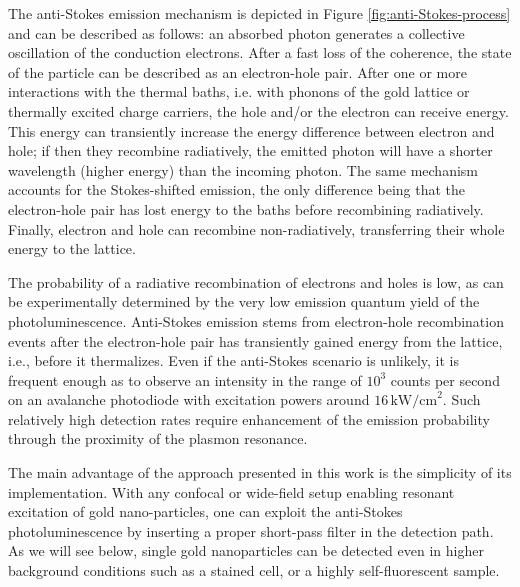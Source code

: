 \documentclass[journal=nalefd,manuscript=letter]{achemso}
\newcommand{\pwr}{\ensuremath{\,\textrm{kW/cm}^2}}
\begin{document}
The anti-Stokes emission mechanism\cite{He2015} is depicted in Figure
\ref{fig:anti-Stokes-process} and can be described as follows: an absorbed
photon generates a collective oscillation of the conduction electrons. After a
fast loss of the coherence\cite{Sonnichsen2002}, the state of the particle can
be described as an electron-hole pair. After one or more interactions with the thermal
baths, i.e. with phonons of the gold lattice\cite{Lin2008} or thermally
excited charge carriers\cite{Sun1994}, the hole and/or the electron can
receive energy. This energy can transiently increase the energy difference between electron and
hole; if then they recombine radiatively, the emitted photon will have a shorter
wavelength (higher energy) than the incoming photon\cite{Huang2014}. The same
mechanism accounts for the Stokes-shifted emission, the only difference being
that the electron-hole pair has lost energy to the baths before recombining
radiatively. Finally, electron and hole can recombine
non-radiatively, transferring their whole energy to the lattice. 

The probability of a radiative recombination of electrons and holes is low,
as can be experimentally determined by the very low emission quantum yield of
the photoluminescence\cite{Yorulmaz2012}\cite{Rao2015}\cite{Sonnichsen2002}. Anti-Stokes
emission stems from electron-hole recombination events after the electron-hole
pair has transiently gained energy from the lattice, i.e., before it thermalizes. Even if the
anti-Stokes scenario is unlikely, it is frequent enough as to observe an
intensity in the range of $10^3$ counts per second on an avalanche photodiode
with excitation powers around $16\pwr$. Such relatively high detection rates
require enhancement of the emission probability through the proximity of the
plasmon resonance\cite{Neupane2013}.

The main advantage of the approach presented in this work is the simplicity of
its implementation. With any confocal or wide-field setup enabling resonant
excitation of gold nano-particles, one can exploit the anti-Stokes
photoluminescence by inserting a proper short-pass filter in the detection path.
As we will see below, single gold nanoparticles can be detected even in higher background conditions
such as a stained cell, or a highly self-fluorescent sample.
\end{document}
